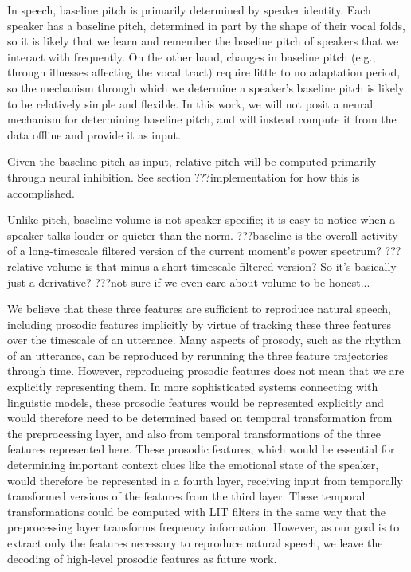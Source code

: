 In speech, baseline pitch is primarily determined
by speaker identity.
Each speaker has a baseline pitch,
determined in part by the shape of their vocal folds,
so it is likely that we learn
and remember the baseline pitch
of speakers that we interact with frequently.
On the other hand,
changes in baseline pitch
(e.g., through illnesses affecting the vocal tract)
require little to no adaptation period,
so the mechanism through which we determine
a speaker's baseline pitch
is likely to be relatively simple
and flexible.
In this work,
we will not posit a neural mechanism
for determining baseline pitch,
and will instead compute it
from the data offline and provide it as input.

Given the baseline pitch as input,
relative pitch will be computed
primarily through neural inhibition.
See section ???implementation
for how this is accomplished.

Unlike pitch, baseline volume
is not speaker specific;
it is easy to notice when a speaker
talks louder or quieter
than the norm.
???baseline is the overall activity
of a long-timescale filtered version
of the current moment's power spectrum?
???relative volume is that minus a
short-timescale filtered version?
So it's basically just a derivative?
???not sure if we even care about volume
to be honest...

We believe that these three features
are sufficient to reproduce natural speech,
including prosodic features implicitly
by virtue of tracking these three features
over the timescale of an utterance.
Many aspects of prosody,
such as the rhythm of an utterance,
can be reproduced by rerunning
the three feature trajectories through time.
However, reproducing prosodic features
does not mean that we are explicitly
representing them.
In more sophisticated systems
connecting with linguistic models,
these prosodic features would
be represented explicitly
and would therefore need to be
determined based on temporal transformation
from the preprocessing layer,
and also from temporal transformations
of the three features represented here.
These prosodic features,
which would be essential for determining
important context clues
like the emotional state of the speaker,
would therefore be represented in
a fourth layer, receiving input from
temporally transformed versions of
the features from the third layer.
These temporal transformations
could be computed with LIT filters
in the same way that the preprocessing layer
transforms frequency information.
However, as our goal is to
extract only the features necessary
to reproduce natural speech,
we leave the decoding of high-level prosodic features
as future work.

